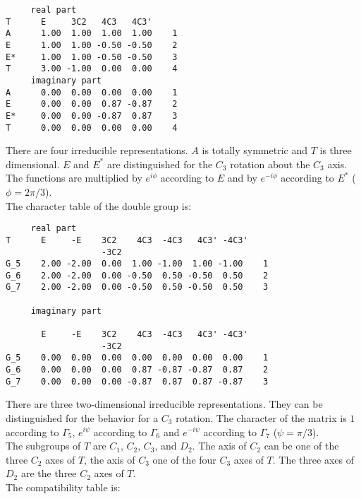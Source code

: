 \documentclass[12pt,a4paper,twoside]{report}
\begin{document}
\begin{tcolorbox}
\begin{footnotesize}
\begin{verbatim}
     real part
T      E     3C2   4C3   4C3' 
A      1.00  1.00  1.00  1.00    1
E      1.00  1.00 -0.50 -0.50    2
E*     1.00  1.00 -0.50 -0.50    3
T      3.00 -1.00  0.00  0.00    4
     imaginary part
A      0.00  0.00  0.00  0.00    1
E      0.00  0.00  0.87 -0.87    2
E*     0.00  0.00 -0.87  0.87    3
T      0.00  0.00  0.00  0.00    4
\end{verbatim}
\end{footnotesize}
\end{tcolorbox}

There are four irreducible representations. $A$ is totally symmetric and
$T$ is three dimensional. $E$ and $E^*$ are distinguished for the $C_3$ rotation
about the $C_3$ axis. The functions are multiplied by $e^{i\phi}$ according
to $E$ and by $e^{-i\phi}$ according to $E^*$ ($\phi=2\pi/3$). \\
The character table of the double group is:

\begin{tcolorbox}
\begin{footnotesize}
\begin{verbatim}
     real part
T      E     -E    3C2    4C3  -4C3   4C3' -4C3'
                   -3C2                         
G_5    2.00 -2.00  0.00  1.00 -1.00  1.00 -1.00    1
G_6    2.00 -2.00  0.00 -0.50  0.50 -0.50  0.50    2
G_7    2.00 -2.00  0.00 -0.50  0.50 -0.50  0.50    3

     imaginary part

       E     -E    3C2    4C3  -4C3   4C3' -4C3'
                   -3C2                         
G_5    0.00  0.00  0.00  0.00  0.00  0.00  0.00    1
G_6    0.00  0.00  0.00  0.87 -0.87 -0.87  0.87    2
G_7    0.00  0.00  0.00 -0.87  0.87  0.87 -0.87    3
\end{verbatim}
\end{footnotesize}
\end{tcolorbox}

There are three two-dimensional irreducible representations. They can be
distinguished for the behavior for a $C_3$ rotation. The character of
the matrix is $1$ according to $\Gamma_5$, $e^{i\psi}$ according to $\Gamma_6$
and $e^{-i\psi}$ according to $\Gamma_7$ ($\psi=\pi/3$). \\
The subgroups of $T$ are $C_1$, $C_2$, $C_3$, and $D_2$. The axis of $C_2$
can be one of the three $C_2$ axes of $T$, the axis of $C_3$ one of the 
four $C_3$ axes of $T$. The three axes of $D_2$ are the three $C_2$ axes of
$T$. \\
The compatibility table is:
\end{document}
